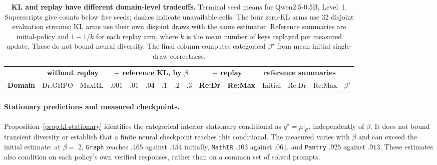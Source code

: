 \begin{table}[t]
  \centering
  \caption{\textbf{KL and replay have different domain-level tradeoffs.}
  Terminal \pmd{} seed means for Qwen2.5-0.5B, Level~1. Superscripts give
  counts below five seeds; dashes indicate unavailable cells. The four
  zero-KL arms use 32 disjoint evaluation streams; KL arms use their own
  disjoint draws with the same estimator. Reference summaries are
  initial-policy \pmd{} and $1-1/\bar k$ for each replay arm, where $\bar k$
  is the mean number of keys replayed per measured update. These do not bound
  neural diversity. The final column computes categorical $\beta^\star$
  from mean initial single-draw correctness.}
  \label{tab:reference-kl-measured}
  \scriptsize
  \setlength{\tabcolsep}{2.5pt}
  \begin{tabular}{@{}lrrrrrrrrrrrrrr@{}}
    \toprule
    & \multicolumn{2}{c}{\textbf{without replay}}
      & \multicolumn{6}{c}{\textbf{$+$ reference KL, by $\beta$}}
      & \multicolumn{2}{c}{\textbf{$+$ replay}}
      & \multicolumn{3}{c}{\textbf{reference summaries}} & \\
    \cmidrule(lr){2-3}\cmidrule(lr){4-9}\cmidrule(lr){10-11}\cmidrule(lr){12-14}
    \textbf{Domain} & Dr.GRPO & MaxRL
      & $.001$ & $.01$ & $.04$ & $.1$ & $.2$ & $.3$
      & \textbf{Re:Dr} & \textbf{Re:Max}
      & Initial & Re:Dr & Re:Max & $\beta^\star$ \\
    \midrule
    
  \end{tabular}
\end{table}

\paragraph{Stationary predictions and measured checkpoints.}
Proposition~\ref{prop:kl-stationary} identifies the categorical interior
stationary conditional as $q^\star=\mu|_{\mathcal C}$, independently of
$\beta$. It does not bound transient diversity or establish that a finite
neural checkpoint reaches this conditional. The measured \pmd{} varies
with $\beta$ and can exceed the initial estimate: at $\beta=.2$, \texttt{Graph}
reaches $.465$ against $.454$ initially, \texttt{MathIR} $.103$ against $.061$,
and \texttt{Pantry} $.925$ against $.913$. These estimates also condition on each
policy's own verified responses, rather than on a common set of solved
prompts.

